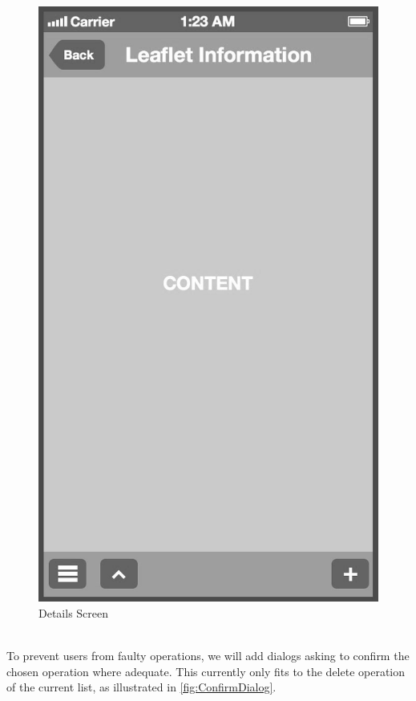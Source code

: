 \begin{figure}[!tb]
\begin{minipage}[b]{0.45\linewidth}
        \includegraphics[width=0.8025\linewidth]{figures/Screen_4_bw.jpg}
        \caption[Pharmaceutical Details Screen]{Details Screen}
        \label{fig:DetailsScreen}
    \end{minipage}
\end{figure}
\\
To prevent users from faulty operations, we will add dialogs asking to confirm the chosen operation where adequate. This currently only fits to the delete operation of the current list, as illustrated in \ref{fig:ConfirmDialog}.
\\

